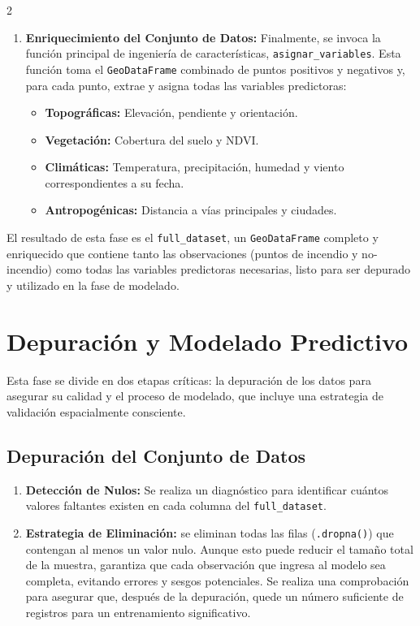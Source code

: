 \documentclass[a4paper,10pt]{article}
\begin{document}
\begin{multicols}{2}
\begin{enumerate}
    \item \textbf{Enriquecimiento del Conjunto de Datos:} Finalmente, se invoca la función principal de ingeniería de características, \texttt{asignar\_variables}. Esta función toma el \texttt{GeoDataFrame} combinado de puntos positivos y negativos y, para cada punto, extrae y asigna todas las variables predictoras:

    \begin{itemize}
        \item \textbf{Topográficas:} Elevación, pendiente y orientación.
        \item \textbf{Vegetación:} Cobertura del suelo y NDVI.
        \item \textbf{Climáticas:} Temperatura, precipitación, humedad y viento correspondientes a su fecha.
        \item \textbf{Antropogénicas:} Distancia a vías principales y ciudades.
    \end{itemize}
\end{enumerate}

El resultado de esta fase es el \texttt{full\_dataset}, un \texttt{GeoDataFrame} completo y enriquecido que contiene tanto las observaciones (puntos de incendio y no-incendio) como todas las variables predictoras necesarias, listo para ser depurado y utilizado en la fase de modelado.

\section{Depuración y Modelado Predictivo}
Esta fase se divide en dos etapas críticas: la depuración de los datos para asegurar su calidad y el proceso de modelado, que incluye una estrategia de validación espacialmente consciente.

\subsection{Depuración del Conjunto de Datos}

\begin{enumerate}
    \item \textbf{Detección de Nulos:} Se realiza un diagnóstico para identificar cuántos valores faltantes existen en cada columna del \texttt{full\_dataset}.
    
    \item \textbf{Estrategia de Eliminación:} se eliminan todas las filas (\texttt{.dropna()}) que contengan al menos un valor nulo. Aunque esto puede reducir el tamaño total de la muestra, garantiza que cada observación que ingresa al modelo sea completa, evitando errores y sesgos potenciales. Se realiza una comprobación para asegurar que, después de la depuración, quede un número suficiente de registros para un entrenamiento significativo.


\end{enumerate}
\end{multicols}
\end{document}
